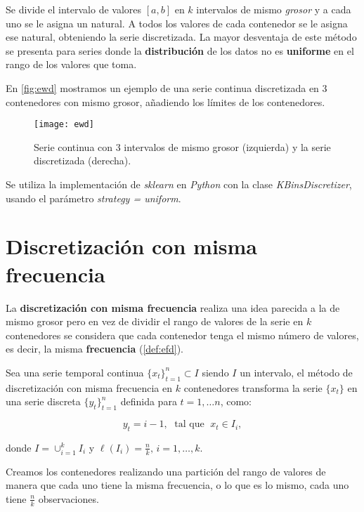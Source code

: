 Se divide el intervalo de valores $[a, b]$ en $k$ intervalos de mismo \emph{grosor} y a cada uno se le asigna un natural. A todos los valores de cada contenedor se le asigna ese natural, obteniendo la serie discretizada. La mayor desventaja de este método se presenta para series donde la \textbf{distribución} de los datos no es \textbf{uniforme} en el rango de los valores que toma.

En \autoref{fig:ewd} mostramos un ejemplo de una serie continua discretizada en 3 contenedores con mismo grosor, añadiendo los límites de los contenedores.

\begin{figure}[htpb]
  \centering
  \texttt{[image: ewd]}
  \caption{Serie continua con 3 intervalos de mismo grosor (izquierda) y la serie discretizada (derecha).}
  \label{fig:ewd}
\end{figure}

Se utiliza la implementación de \emph{sklearn} en \emph{Python} con la clase \emph{KBinsDiscretizer}, usando el parámetro \emph{strategy = uniform}.

\section{Discretización con misma frecuencia}

La \textbf{discretización con misma frecuencia} realiza una idea parecida a la de mismo grosor pero en vez de dividir el rango de valores de la serie en $k$ contenedores se considera que cada contenedor tenga el mismo número de valores, es decir, la misma \textbf{frecuencia} (\autoref{def:efd}).

\begin{definicion}
  Sea una serie temporal continua $\{x_t\}_{t = 1}^n \subset I$  siendo $I$ un intervalo, el método de discretización con misma frecuencia en $k$ contenedores transforma la serie $\{x_t\}$ en una serie discreta $\{y_t\}_{t = 1}^n$ definida para $t = 1, \ldots n$, como:

  $$y_t = i-1, \; \text{ tal que } \; x_t \in I_i,$$

  donde $I = \cup_{i = 1}^k I_i$ y $\ell(I_i) = \frac{n}{k}, \, i = 1, \ldots, k$.
  \label{def:efd}
\end{definicion}

Creamos los contenedores realizando una partición del rango de valores de manera que cada uno tiene la misma frecuencia, o lo que es lo mismo, cada uno tiene $\frac{n}{k}$ observaciones.


